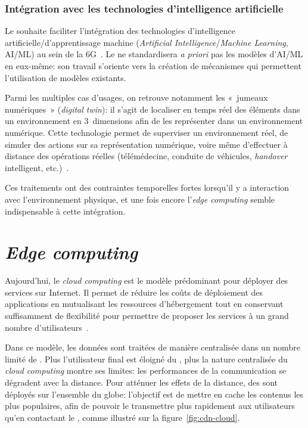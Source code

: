 \documentclass[../main.tex]{subfiles}
\begin{document}
\subsubsection{Intégration avec les technologies d’intelligence artificielle}
Le  souhaite faciliter l’intégration des technologies d’intelligence artificielle/d’apprentissage machine (\textit{Artificial Intelligence}/\textit{Machine Learning}, AI/ML) au sein de la 6G~\cite{3GPP.NEWS.2025.AIML}. Le  ne standardisera \textit{a priori} pas les modèles d’AI/ML en eux-même: son travail s’oriente vers la création de mécanismes qui permettent l’utilisation de modèles existants.

Parmi les multiples cas d’usages, on retrouve notamment les « jumeaux numériques » (\textit{digital twin}): il s’agit de localiser en temps réel des éléments dans un environnement en 3~dimensions afin de les représenter dans un environnement numérique. Cette technologie permet de superviser un environnement réel, de simuler des actions sur sa représentation numérique, voire même d’effectuer à distance des opérations réelles (télémédecine, conduite de véhicules, \textit{handover} intelligent, etc.)~\cite{10.1109/MCOM.001.21143}.

Ces traitements ont des contraintes temporelles fortes lorsqu’il y a interaction avec l’environnement physique, et une fois encore l’\textit{edge computing} semble indispensable à cette intégration.

\pagebreak
\section{\textit{Edge computing}}
\label{sec:edge-computing}
Aujourd'hui, le \textit{cloud computing} est le modèle prédominant pour déployer des services sur Internet. Il permet de réduire les coûts de déploiement des applications en mutualisant les ressources d’hébergement tout en conservant suffisamment de flexibilité pour permettre de proposer les services à un grand nombre d’utilisateurs~\cite{10.1109/CloudSummit47114.2019.00007}.

Dans ce modèle, les données sont traitées de manière centralisée dans un nombre limité de . Plus l’utilisateur final est éloigné du , plus la nature centralisée du \textit{cloud computing} montre ses limites: les performances de la communication se dégradent avec la distance.
Pour atténuer les effets de la distance, des  sont déployés sur l’ensemble du globe: l’objectif est de mettre en cache les contenus les plus populaires, afin de pouvoir le transmettre plus rapidement aux utilisateurs qu’en contactant le , comme illustré sur la figure~\ref{fig:cdn-cloud}.
\end{document}
